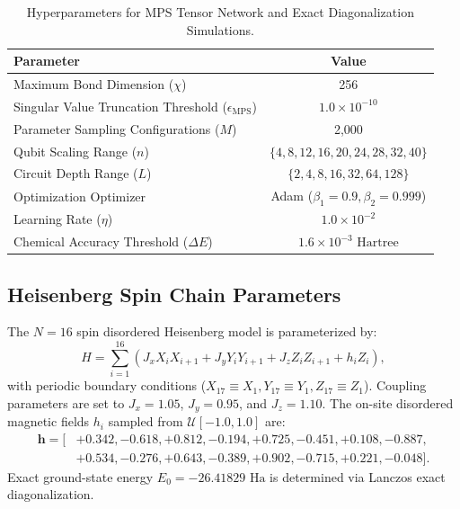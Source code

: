 \documentclass{article}
\begin{document}
\begin{table}[h]
\caption{Hyperparameters for MPS Tensor Network and Exact Diagonalization Simulations.}
\label{tab:mps_hyperparameters}
\begin{center}
\begin{tabular}{lc}
\toprule
\textbf{Parameter} & \textbf{Value} \\
\midrule
Maximum Bond Dimension ($\chi$)            & 256 \\
Singular Value Truncation Threshold ($\epsilon_{\mathrm{MPS}}$) & $1.0 \times 10^{-10}$ \\
Parameter Sampling Configurations ($M$)    & 2{,}000 \\
Qubit Scaling Range ($n$)                  & $\{4, 8, 12, 16, 20, 24, 28, 32, 40\}$ \\
Circuit Depth Range ($L$)                  & $\{2, 4, 8, 16, 32, 64, 128\}$ \\
Optimization Optimizer                     & Adam ($\beta_1 = 0.9, \beta_2 = 0.999$) \\
Learning Rate ($\eta$)                     & $1.0 \times 10^{-2}$ \\
Chemical Accuracy Threshold ($\Delta E$)   & $1.6 \times 10^{-3}\text{ Hartree}$ \\
\bottomrule
\end{tabular}
\end{center}
\end{table}

\subsection{Heisenberg Spin Chain Parameters}
\label{sec:heisenberg_parameters}

The $N=16$ spin disordered Heisenberg model is parameterized by:
\begin{equation}
H = \sum_{i=1}^{16} \left( J_x X_i X_{i+1} + J_y Y_i Y_{i+1} + J_z Z_i Z_{i+1} + h_i Z_i \right),
\end{equation}
with periodic boundary conditions ($X_{17} \equiv X_1, Y_{17} \equiv Y_1, Z_{17} \equiv Z_1$). Coupling parameters are set to $J_x = 1.05$, $J_y = 0.95$, and $J_z = 1.10$. The on-site disordered magnetic fields $h_i$ sampled from $\mathcal{U}[-1.0, 1.0]$ are:
\begin{align*}
\boldsymbol{h} = [&+0.342, -0.618, +0.812, -0.194, +0.725, -0.451, +0.108, -0.887, \\
                  &+0.534, -0.276, +0.643, -0.389, +0.902, -0.715, +0.221, -0.048].
\end{align*}
Exact ground-state energy $E_0 = -26.41829\text{ Ha}$ is determined via Lanczos exact diagonalization.
\end{document}
